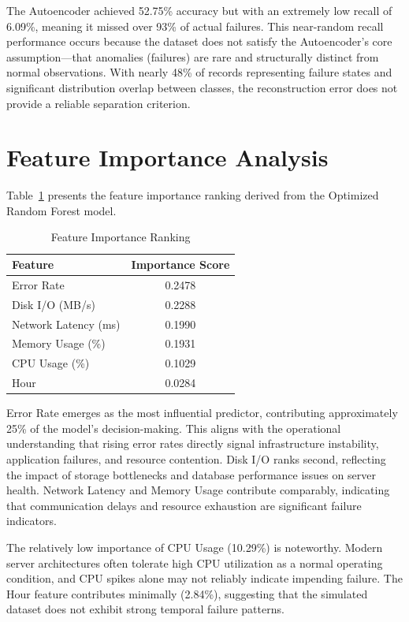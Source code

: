 \documentclass[12pt,letterpaper]{report}
\begin{document}
The Autoencoder achieved 52.75\% accuracy but with an extremely low recall of 6.09\%, meaning it missed over 93\% of actual failures. This near-random recall performance occurs because the dataset does not satisfy the Autoencoder's core assumption---that anomalies (failures) are rare and structurally distinct from normal observations. With nearly 48\% of records representing failure states and significant distribution overlap between classes, the reconstruction error does not provide a reliable separation criterion.

\section{Feature Importance Analysis}

Table~\ref{tab:feature_importance} presents the feature importance ranking derived from the Optimized Random Forest model.

\begin{table}[H]
\centering
\caption{Feature Importance Ranking}
\label{tab:feature_importance}
\begin{tabular}{lc}
\toprule
\textbf{Feature} & \textbf{Importance Score} \\
\midrule
Error Rate & 0.2478 \\
Disk I/O (MB/s) & 0.2288 \\
Network Latency (ms) & 0.1990 \\
Memory Usage (\%) & 0.1931 \\
CPU Usage (\%) & 0.1029 \\
Hour & 0.0284 \\
\bottomrule
\end{tabular}
\end{table}

Error Rate emerges as the most influential predictor, contributing approximately 25\% of the model's decision-making. This aligns with the operational understanding that rising error rates directly signal infrastructure instability, application failures, and resource contention. Disk I/O ranks second, reflecting the impact of storage bottlenecks and database performance issues on server health. Network Latency and Memory Usage contribute comparably, indicating that communication delays and resource exhaustion are significant failure indicators.

The relatively low importance of CPU Usage (10.29\%) is noteworthy. Modern server architectures often tolerate high CPU utilization as a normal operating condition, and CPU spikes alone may not reliably indicate impending failure. The Hour feature contributes minimally (2.84\%), suggesting that the simulated dataset does not exhibit strong temporal failure patterns.
\end{document}
